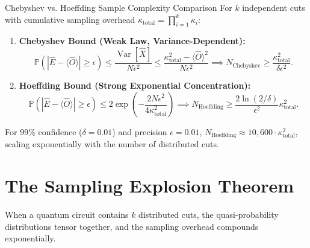\begin{theorembox}{Chebyshev vs. Hoeffding Sample Complexity Comparison}
For $k$ independent cuts with cumulative sampling overhead $\kappa_{\text{total}} = \prod_{i=1}^k \kappa_i$:
\begin{enumerate}
    \item \textbf{Chebyshev Bound (Weak Law, Variance-Dependent):}
    \begin{equation}
        \mathbb{P}\left( |\hat{E} - \langle \hat{O} \rangle| \ge \epsilon \right) \le \frac{\operatorname{Var}[\hat{X}]}{N \epsilon^2} \le \frac{\kappa_{\text{total}}^2 - \langle \hat{O} \rangle^2}{N \epsilon^2} \implies N_{\text{Chebyshev}} \ge \frac{\kappa_{\text{total}}^2}{\delta \epsilon^2}.
    \end{equation}
    \item \textbf{Hoeffding Bound (Strong Exponential Concentration):}
    \begin{equation}
        \mathbb{P}\left( |\hat{E} - \langle \hat{O} \rangle| \ge \epsilon \right) \le 2 \exp\left( -\frac{2 N \epsilon^2}{4 \kappa_{\text{total}}^2} \right) \implies N_{\text{Hoeffding}} \ge \frac{2 \ln(2/\delta)}{\epsilon^2} \kappa_{\text{total}}^2.
    \end{equation}
\end{enumerate}
For 99\% confidence ($\delta = 0.01$) and precision $\epsilon = 0.01$, $N_{\text{Hoeffding}} \approx 10{,}600 \cdot \kappa_{\text{total}}^2$, scaling exponentially with the number of distributed cuts.
\end{theorembox}

\section{The Sampling Explosion Theorem}
\label{sec:sampling_explosion}

When a quantum circuit contains $k$ distributed cuts, the quasi-probability distributions tensor together, and the sampling overhead compounds exponentially.

